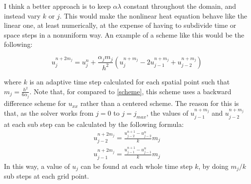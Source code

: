 \documentclass[11pt]{amsart}
\begin{document}
 
I think a better approach is to keep $\alpha\lambda$ constant throughout the domain, and instead vary $k$ or $j$. This would make the nonlinear heat equation behave like the linear one, at least numerically, at the expense of having to subdivide time or space steps in a nonuniform way. An example of a scheme like this would be the following: 

\begin{equation} 
u_j^{n+2m_j} = u_j^n +\frac{\alpha_j m_j }{h^2}  (u_{j}^{n+m_j} - 2u_{j-1}^{n+m_j} + u_{j-2}^{n+m_j})
\end{equation} 

where $k$ is an adaptive time step calculated for each spatial point such that $m_j = \frac{h^2}{6\alpha_j}$. 
Note that, for compared to \eqref{scheme}, this scheme uses a backward difference scheme for $u_{xx}$ rather than a centered scheme. The reason for this is that, as the solver works from $j=0$ to $j=j_{max}$, the values of $u_{j-1}^{n+m_j}$ and $u_{j-2}^{n+m_j}$ at each sub step can be calculated by the following formula: 
\begin{eqnarray} 
 u_{j-2}^{n+2m_j} = \frac{u_{j-2}^{n+1}- u_{j-2}^{n}}{k} m_j \\
  u_{j-1}^{n+2m_j} = \frac{u_{j-1}^{n+1}- u_{j-1}^{n}}{k} m_j 
\end{eqnarray} 
In this way, a value of $u_j$ can be found at each whole time step $k$, by doing  $m_j/k$ sub steps at each grid point. 
\end{document}
